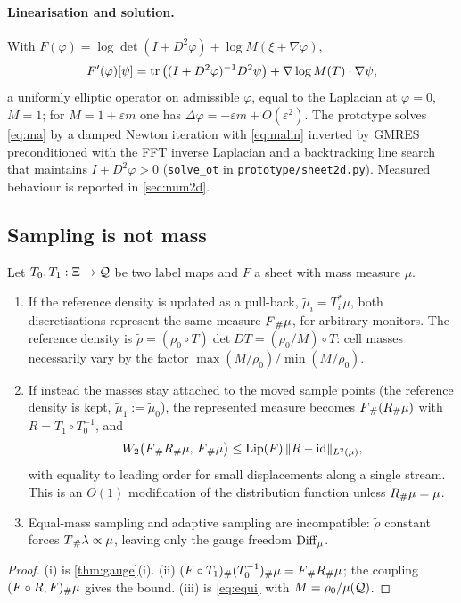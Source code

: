 \paragraph{Linearisation and solution.} With $F(\varphi)=\log\det(I+D^2\varphi)+\log M(\xi+\nabla\varphi)$,
\begin{equation}\label{eq:malin}
F'(\varphi)[\psi]=\operatorname{tr}\big((I+D^2\varphi)^{-1}D^2\psi\big)+\nabla\log M(T)\cdot\nabla\psi ,
\end{equation}
a uniformly elliptic operator on admissible $\varphi$, equal to the Laplacian at $\varphi=0$, $M=1$; for
$M=1+\varepsilon m$ one has $\Delta\varphi=-\varepsilon m+O(\varepsilon^2)$. The prototype solves \eqref{eq:ma} by a
damped Newton iteration with \eqref{eq:malin} inverted by GMRES preconditioned with the FFT inverse Laplacian and
a backtracking line search that maintains $I+D^2\varphi>0$ (\texttt{solve\_ot} in \texttt{prototype/sheet2d.py}).
Measured behaviour is reported in \cref{sec:num2d}.

\subsection{Sampling is not mass}

\begin{proposition}\label{prop:sampling}
Let $T_0,T_1:\Xi\to\mathcal{Q}$ be two label maps and $F$ a sheet with mass measure $\mu$.
\begin{enumerate}[label=(\roman*),leftmargin=2.2em,itemsep=1pt]
\item If the reference density is updated as a pull-back, $\tilde\mu_i=T_i^*\mu$, both discretisations represent the
same measure $F{}_{\#}\mu$, for arbitrary monitors. The reference density is $\tilde\rho=(\rho_0\circ T)\det DT=(\rho_0/M)\circ T$:
cell masses necessarily vary by the factor $\max(M/\rho_0)/\min(M/\rho_0)$.
\item If instead the masses stay attached to the moved sample points (the reference density is kept,
$\tilde\mu_1:=\tilde\mu_0$), the represented measure becomes $F{}_{\#}(R{}_{\#}\mu)$ with $R=T_1\circ T_0^{-1}$, and
\begin{equation}\label{eq:w2}
W_2\big(F{}_{\#} R{}_{\#}\mu,\,F{}_{\#}\mu\big)\le\operatorname{Lip}(F)\,\lVert R-\mathrm{id}\rVert_{L^2(\mu)},
\end{equation}
with equality to leading order for small displacements along a single stream. This is an $O(1)$ modification of the
distribution function unless $R{}_{\#}\mu=\mu$.
\item Equal-mass sampling and adaptive sampling are incompatible: $\tilde\rho$ constant forces $T{}_{\#}\lambda\propto\mu$,
leaving only the gauge freedom $\operatorname{Diff}_\mu$.
\end{enumerate}
\end{proposition}
\begin{proof}
(i) is \cref{thm:gauge}(i). (ii) $(F\circ T_1){}_{\#}(T_0^{-1}){}_{\#}\mu=F{}_{\#} R{}_{\#}\mu$; the coupling $(F\circ R,F){}_{\#}\mu$ gives
the bound. (iii) is \eqref{eq:equi} with $M=\rho_0/\mu(\mathcal{Q})$.
\end{proof}

